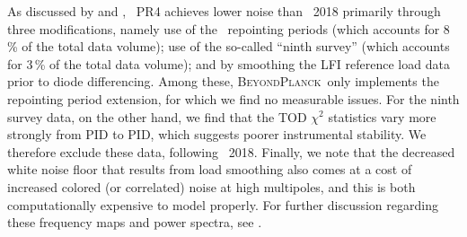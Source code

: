 \documentclass[twocolumn]{aa}
\newcommand{\BP}{\textsc{BeyondPlanck}}
\begin{document}
As discussed by \citet{planck2020-LVII} and \citet{bp10}, \Planck\ PR4
achieves lower noise than \Planck\ 2018 primarily through three
modifications, namely use of the \Planck\ repointing periods (which
accounts for 8\,\% of the total data volume); use of the so-called
``ninth survey'' (which accounts for 3\,\% of the total data volume);
and by smoothing the LFI reference load data prior to diode
differencing. Among these, \BP\ only implements the repointing period
extension, for which we find no measurable issues. For the ninth
survey data, on the other hand, we find that the TOD $\chi^2$
statistics vary more strongly from PID to PID, which suggests poorer
instrumental stability. We therefore exclude these data, following
\Planck\ 2018. Finally, we note that the decreased white noise floor
that results from load smoothing also comes at a cost of increased
colored (or correlated) noise at high multipoles, and this is both
computationally expensive to model properly. For further discussion
regarding these frequency maps and power spectra, see \citet{bp10}.
\end{document}
